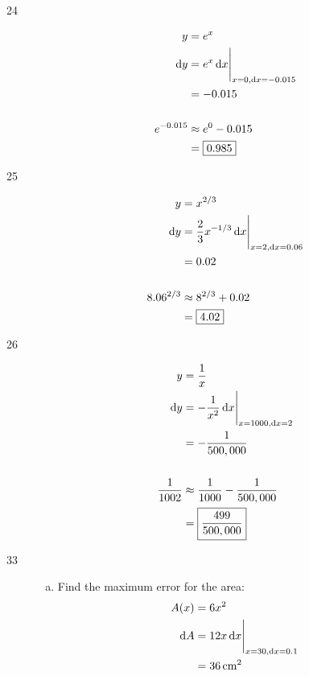\documentclass[letterpaper, landscape]{exam}
\newcommand{\dx}{\dif x}
\newcommand{\dy}{\dif y}
\begin{document}
\begin{description}
    \item[24]
      \begin{align*}
        y          & = e^x \\
        \dy        & =  \eval{ e^x \dx }_{x = 0, \dx = -0.015 } \\
                   & = -0.015 \\
        \\
        e^{-0.015} & \approx e^0 - 0.015 \\
                   & = \boxed{ 0.985 } \\
      \end{align*}

    \item[25]
      \begin{align*}
        y          & = x^{2/3} \\
        \dy        & =  \eval{ \frac{2}{3} x^{-1/3} \dx }_{x = 2, \dx = 0.06 } \\
                   & = 0.02 \\
        \\
        8.06^{2/3} & \approx 8^{2/3} + 0.02 \\
                   & = \boxed{ 4.02 } \\
      \end{align*}

    \item[26]
      \begin{align*}
        y              & = \frac{1}{x} \\
        \dy            & =  \eval{ - \frac{1}{x^2} \dx }_{x = 1000, \dx = 2 } \\
                       & = - \frac{1}{500,000} \\
        \\
        \frac{1}{1002} & \approx \frac{1}{1000} - \frac{1}{500,000} \\
                       & = \boxed{ \frac{499}{500,000} }
     \end{align*}

    \newpage

    \item[33]
      \begin{enumerate}[(a)]
        \item 
          Find the maximum error for the area:
          \begin{align*}
            A(x)   & = 6x^2 \\
            \dif A & = \eval{ 12x \dx }_{x = 30, \dx = 0.1} \\
                   & = \unit[36]{cm^2} \\
          \end{align*}


\end{enumerate}
\end{description}
\end{document}
